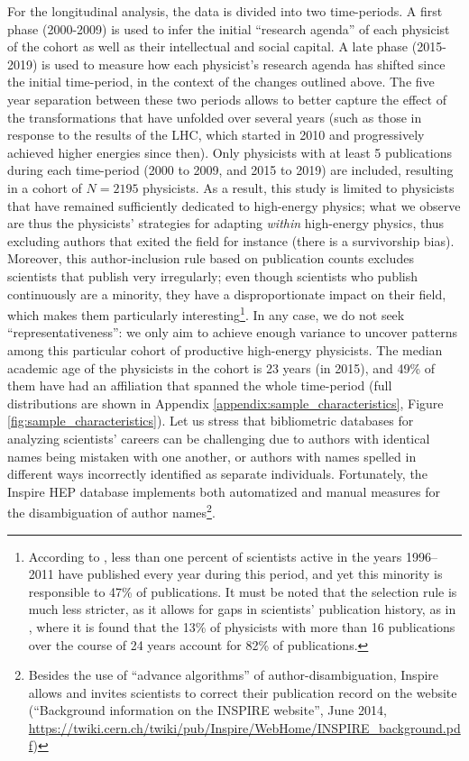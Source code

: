 \documentclass{article}
\begin{document}
For the longitudinal analysis, the data is divided into two time-periods. A first phase (2000-2009) is used to infer the initial ``research agenda'' of each physicist of the cohort as well as their intellectual and social capital. A late phase (2015-2019) is used to measure how each physicist's research agenda has shifted since the initial time-period, in the context of the changes outlined above. The five year separation between these two periods allows to better capture the effect of the transformations that have unfolded over several years (such as those in response to the results of the LHC, which started in 2010 and progressively achieved higher energies since then). Only physicists with at least 5 publications during each time-period (2000 to 2009, and 2015 to 2019) are included, resulting in a cohort of $N=2195$ physicists. As a result, this study is limited to physicists that have remained sufficiently dedicated to high-energy physics; what we observe are thus the physicists' strategies for adapting \textit{within} high-energy physics, thus excluding authors that exited the field for instance (there is a survivorship bias). Moreover, this author-inclusion rule based on publication counts excludes scientists that publish very irregularly; even though scientists who publish continuously are a minority, they have a disproportionate impact on their field, which makes them particularly interesting\footnote{According to  \citet{Ioannidis2014}, less than one percent of scientists active in the years 1996–2011 have published every year during this period, and yet this minority is responsible to 47\% of publications. It must be noted that the selection rule is much less stricter, as it allows for gaps in scientists' publication history, as in \citealt{Feifan2023}, where it is found that the 13\% of physicists with more than 16 publications over the course of 24 years account for 82\% of publications.}. In any case, we do not seek ``representativeness'': we only aim to achieve enough variance to uncover patterns among this particular cohort of productive high-energy physicists. The median academic age of the physicists in the cohort is 23 years (in 2015), and 49\% of them have had an affiliation that spanned the whole time-period (full distributions are shown in Appendix \ref{appendix:sample_characteristics}, Figure \ref{fig:sample_characteristics}). Let us stress that bibliometric databases for analyzing scientists' careers can be challenging due to authors with identical names being mistaken with one another, or authors with names spelled in different ways incorrectly identified as separate individuals. Fortunately, the Inspire HEP database implements both automatized and manual measures for the disambiguation of author names\footnote{Besides the use of ``advance algorithms'' of author-disambiguation, Inspire allows and invites scientists to correct their publication record on the website (``Background	information	on	the	INSPIRE	website'', June 2014, \url{https://twiki.cern.ch/twiki/pub/Inspire/WebHome/INSPIRE_background.pdf})}. %
\end{document}
